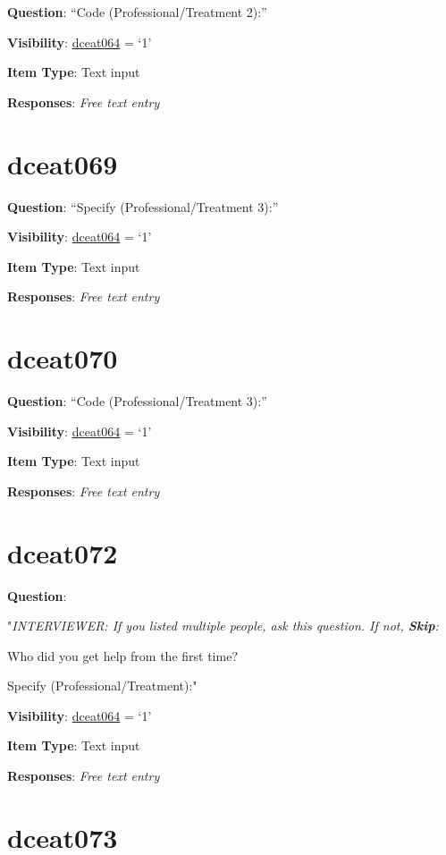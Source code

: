 \documentclass[]{book}
\begin{document}
\textbf{Question}: ``Code (Professional/Treatment 2):''

\textbf{Visibility}: \protect\hyperlink{dceat064}{dceat064} = `1'

\textbf{Item Type}: Text input

\textbf{Responses}: \emph{Free text entry}

\hypertarget{dceat069}{%
\section{dceat069}\label{dceat069}}

\textbf{Question}: ``Specify (Professional/Treatment 3):''

\textbf{Visibility}: \protect\hyperlink{dceat064}{dceat064} = `1'

\textbf{Item Type}: Text input

\textbf{Responses}: \emph{Free text entry}

\hypertarget{dceat070}{%
\section{dceat070}\label{dceat070}}

\textbf{Question}: ``Code (Professional/Treatment 3):''

\textbf{Visibility}: \protect\hyperlink{dceat064}{dceat064} = `1'

\textbf{Item Type}: Text input

\textbf{Responses}: \emph{Free text entry}

\hypertarget{dceat072}{%
\section{dceat072}\label{dceat072}}

\textbf{Question}:

"\emph{INTERVIEWER: If you listed multiple people, ask this question. If not, \textbf{Skip}:}

Who did you get help from the first time?

Specify (Professional/Treatment):"

\textbf{Visibility}: \protect\hyperlink{dceat064}{dceat064} = `1'

\textbf{Item Type}: Text input

\textbf{Responses}: \emph{Free text entry}

\hypertarget{dceat073}{%
\section{dceat073}\label{dceat073}}
\end{document}
